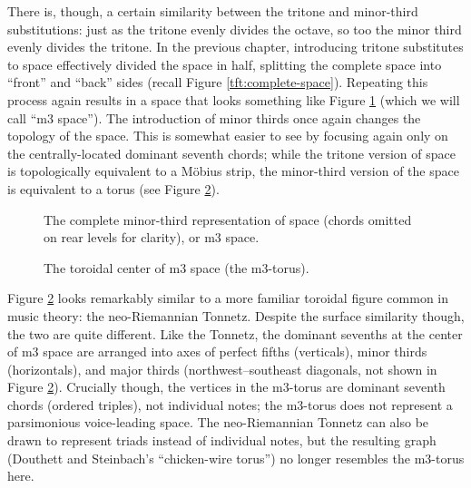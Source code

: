 There is, though, a certain similarity between the tritone and minor-third
substitutions: just as the tritone evenly divides the octave, so too the minor
third evenly divides the tritone. In the previous chapter, introducing tritone
substitutes to \tf space effectively divided the space in half, splitting the
complete space into ``front'' and ``back'' sides (recall Figure
\ref{tft:complete-space}). Repeating this process again results in a space
that looks something like Figure \ref{mts:m3-space} (which we will call ``m3
space''). The introduction of minor thirds once again changes the topology of
the space. This is somewhat easier to see by focusing again only on the
centrally-located dominant seventh chords; while the tritone version of \tf
space is topologically equivalent to a Möbius strip, the minor-third version
of the space is equivalent to a torus (see Figure
\ref{mts:m3-torus}).

\begin{figure}[tbp]
  \caption[The complete minor-third representation of \tf space (m3 space).]{The
    complete minor-third representation of \tf space (\ii chords omitted on
    rear levels for clarity), or m3 space.}
  \label{mts:m3-space}
\end{figure}


\begin{figure}[tbp]
  \caption{The toroidal center of m3 space (the m3-torus).}
  \label{mts:m3-torus}
\end{figure}

Figure \ref{mts:m3-torus} looks remarkably similar to a more familiar toroidal
figure common in music theory: the neo-Riemannian Tonnetz. Despite the surface
similarity though, the two are quite different. Like the Tonnetz, the dominant
sevenths at the center of m3 space are arranged into axes of perfect fifths
(verticals), minor thirds (horizontals), and major thirds (northwest--southeast
diagonals, not shown in Figure \ref{mts:m3-torus}). Crucially though, the
vertices in the m3-torus are dominant seventh chords (ordered triples), not
individual notes; the m3-torus does not represent a parsimonious voice-leading
space. The neo-Riemannian Tonnetz can also be drawn to represent triads instead of
individual notes, but the resulting graph (Douthett and Steinbach's
``chicken-wire torus'') no longer resembles the m3-torus here.

